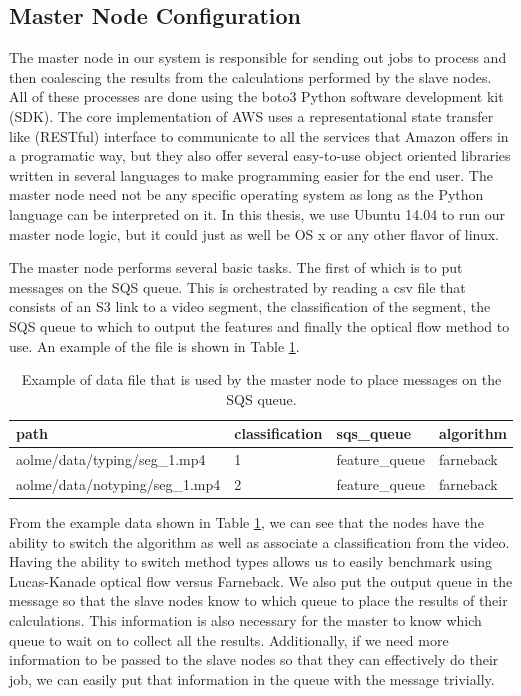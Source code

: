 \subsection{\label{subsection:master_node}Master Node Configuration}
The master node in our system is responsible for sending out jobs to process and
then coalescing the results from the calculations performed by the slave nodes.
All of these processes are done using the boto3 \cite{boto3} Python  software
development kit (SDK). The core implementation of AWS uses a  representational
state transfer like (RESTful) interface to communicate to all the services that
Amazon offers in a programatic  way, but they also offer several easy-to-use
object oriented libraries written  in several languages to make programming easier
for the end user. The master node
need not be any specific operating system as long as the Python language
can be interpreted on it. In this thesis, we use Ubuntu 14.04 to run our master
node logic, but it could just as well be OS x or any other flavor of linux.

The master node performs several basic tasks. The first of which is to put
messages on the SQS queue.  This is orchestrated by reading
a csv file that consists of an S3 link to a video segment, the classification of
the segment, the SQS queue to which to output the features and finally the
optical flow method to use. An example of the file is shown in Table
 \ref{tab:message_queue}.

\begin{table}[h]
  \begin{tabular}{ | l | l | l | p{2cm} |}
  \hline
  \textbf{path} & \textbf{classification} & \textbf{sqs\_queue} & \textbf{algorithm}\\ \hline
  aolme/data/typing/seg\_1.mp4 & 1 & feature\_queue & farneback \\ \hline
  aolme/data/notyping/seg\_1.mp4 & 2 & feature\_queue & farneback \\
  \hline
  \end{tabular}
  \caption{Example of data file that is used by the master node to place messages on
  the SQS queue. }
  \label{tab:message_queue}
\end{table}

\FloatBarrier

From the example data shown in Table \ref{tab:message_queue}, we can see that
the nodes have the ability to switch the algorithm as well as associate a
classification from the video. Having the ability to switch method types allows
us to easily benchmark using Lucas-Kanade optical flow versus Farneback.
We also put the output queue in the message so that the slave nodes know to which
queue to place the results of their calculations. This information is also necessary
for the master to know which queue to wait on to collect all the results. Additionally,
if we need more information to be passed to the slave nodes so that they can
effectively do their job, we can easily put that information in the queue with
the message trivially.

